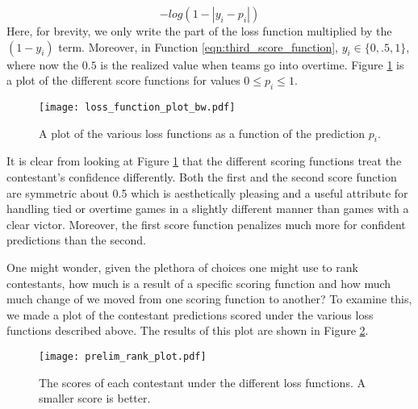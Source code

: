 \begin{equation}\label{eqn:third_score_function}
-log(1-|y_i-p_i|)
\end{equation} 
Here, for brevity, we only write the part of the loss function multiplied by the $(1-y_i)$ term. Moreover, in Function \ref{eqn:third_score_function}, $y_i \in \{0,.5,1\}$, where now the $0.5$ is the realized value when teams go into overtime. Figure \ref{fig:scoring_functions} is a plot of the different score functions for values $0\leq p_i \leq 1$.  


\begin{figure}[h]
\centering
\texttt{[image: loss\_function\_plot\_bw.pdf]}
\caption{A plot of the various loss functions as a function of the prediction $p_i$.  }
\label{fig:scoring_functions}
\end{figure}

It is clear from looking at Figure \ref{fig:scoring_functions} that the different scoring functions treat the contestant's confidence differently. Both the first and the second score function are symmetric about 0.5 which is aesthetically pleasing and a useful attribute for handling tied or overtime games in a slightly different manner than games with a clear victor. Moreover, the first score function penalizes much more for confident predictions than the second. 

One might wonder, given the plethora of choices one might use to rank contestants, how much is a result of a specific scoring function and how much much change of  we moved from one scoring function to another? To examine this, we made a plot of the contestant predictions scored under the various loss functions described above. The results of this plot are shown in Figure \ref{fig:score_rank_plot}. 

  \begin{figure}[h]
\centering
\texttt{[image: prelim\_rank\_plot.pdf]}
\caption{The scores of each contestant under the different loss functions. A smaller score is better.  }
\label{fig:score_rank_plot}
\end{figure}



